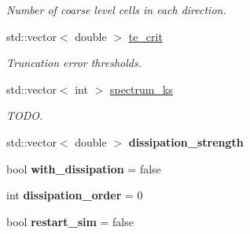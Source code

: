 \begin{DoxyCompactItemize}
\begin{DoxyCompactList}\small\item\em Number of coarse level cells in each direction. \end{DoxyCompactList}\item 
\mbox{\label{classsledgehamr_1_1Sledgehamr_a1d32f49c7150d593c48e2952f27f6da9}} 
std\+::vector$<$ double $>$ \mbox{\hyperlink{classsledgehamr_1_1Sledgehamr_a1d32f49c7150d593c48e2952f27f6da9}{te\+\_\+crit}}
\begin{DoxyCompactList}\small\item\em Truncation error thresholds. \end{DoxyCompactList}\item 
\mbox{\label{classsledgehamr_1_1Sledgehamr_ab7a2e0686f9fba4e696c0d8988afc853}} 
std\+::vector$<$ int $>$ \mbox{\hyperlink{classsledgehamr_1_1Sledgehamr_ab7a2e0686f9fba4e696c0d8988afc853}{spectrum\+\_\+ks}}
\begin{DoxyCompactList}\small\item\em T\+O\+DO. \end{DoxyCompactList}\item 
\mbox{\label{classsledgehamr_1_1Sledgehamr_a74c116d587474586db4f44ebe5512740}} 
std\+::vector$<$ double $>$ {\bfseries dissipation\+\_\+strength}
\item 
\mbox{\label{classsledgehamr_1_1Sledgehamr_a355e94b7c7910b4291356530ce2d240a}} 
bool {\bfseries with\+\_\+dissipation} = false
\item 
\mbox{\label{classsledgehamr_1_1Sledgehamr_adccd9747c433c6d79d7393311b58073b}} 
int {\bfseries dissipation\+\_\+order} = 0
\item 
\mbox{\label{classsledgehamr_1_1Sledgehamr_ae2c994a4b05f9e29a965d02ab4e1557b}} 
bool {\bfseries restart\+\_\+sim} = false
\end{DoxyCompactItemize}
